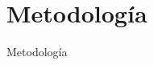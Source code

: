 \hypertarget{metodología}{%
    \section{Metodología}\label{Metodología}}
    \vfill
    Metodología
    \vfill